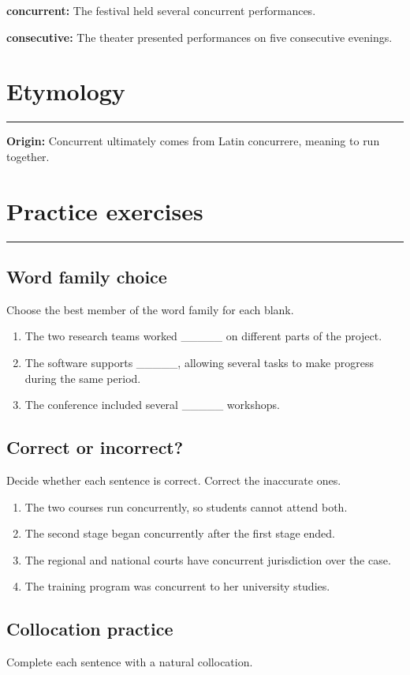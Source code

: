 \documentclass[11pt]{article}
\newcommand{\sectionrule}{\par\vspace{-0.5em}\noindent\textcolor{Accent}{\rule{\linewidth}{0.6pt}}\par}
\begin{document}
\textbf{concurrent:} The festival held several concurrent performances.

\textbf{consecutive:} The theater presented performances on five consecutive evenings.

\section{Etymology}
\sectionrule
\textbf{Origin:} Concurrent ultimately comes from Latin concurrere, meaning to run together.

\section{Practice exercises}
\sectionrule
\subsection{Word family choice}
Choose the best member of the word family for each blank.

\begin{enumerate}
  \item The two research teams worked \_\_\_\_\_ on different parts of the project.
  \item The software supports \_\_\_\_\_, allowing several tasks to make progress during the same period.
  \item The conference included several \_\_\_\_\_ workshops.
\end{enumerate}

\subsection{Correct or incorrect?}
Decide whether each sentence is correct. Correct the inaccurate ones.

\begin{enumerate}
  \item The two courses run concurrently, so students cannot attend both.
  \item The second stage began concurrently after the first stage ended.
  \item The regional and national courts have concurrent jurisdiction over the case.
  \item The training program was concurrent to her university studies.
\end{enumerate}

\subsection{Collocation practice}
Complete each sentence with a natural collocation.
\end{document}
